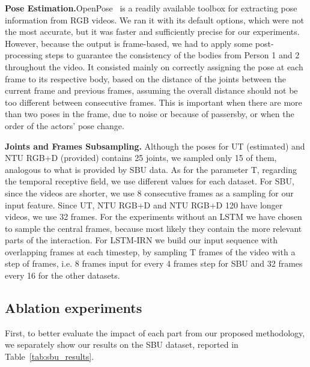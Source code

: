 \documentclass[journal,twoside]{IEEEtran}
\begin{document}
\textbf{Pose Estimation.}\quad OpenPose~\cite{Cao2018} is a readily available toolbox for extracting pose information from RGB videos. We ran it with its default options, which were not the most accurate, but it was faster and sufficiently precise for our experiments.
However, because the output is frame-based, we had to apply some post-processing steps to guarantee the consistency of the bodies from Person 1 and 2 throughout the video.
It consisted mainly on correctly assigning the pose at each frame to its respective body, based on the distance of the joints between the current frame and previous frames, assuming the overall distance should not be too different between consecutive frames.
This is important when there are more than two poses in the frame, due to noise or because of passersby, or when the order of the actors' pose change.

\textbf{Joints and Frames Subsampling.}\quad 
Although the poses for UT (estimated) and NTU RGB+D (provided) contains 25 joints, we sampled only 15 of them, analogous to what is provided by SBU data. 
As for the parameter T, regarding the temporal receptive field, we use different values for each dataset.
For SBU, since the videos are shorter, we use 8 consecutive frames as a sampling for our input feature. Since UT, NTU RGB+D and NTU RGB+D 120 have longer videos, we use 32 frames. 
For the experiments without an LSTM we have chosen to sample the central frames, because most likely they contain the more relevant parts of the interaction.
For LSTM-IRN we build our input sequence with overlapping frames at each timestep, by sampling T frames of the video with a step of  frames, i.e. 8 frames input for every 4 frames step for SBU and 32 frames every 16 for the other datasets.


\subsection{Ablation experiments}

First, to better evaluate the impact of each part from our proposed methodology, we separately show our results on the SBU dataset, reported in Table~\ref{tab:sbu_results}. 
\end{document}
